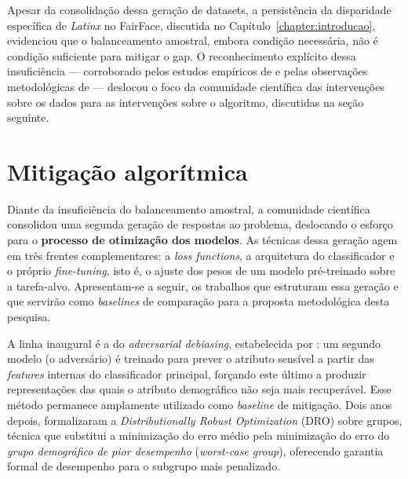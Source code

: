 Apesar da consolidação dessa geração de datasets, a persistência da disparidade específica de \emph{Latinx} no FairFace, discutida no Capítulo~\ref{chapter:introducao}, evidenciou que o balanceamento amostral, embora condição necessária, não é condição suficiente para mitigar o gap. O reconhecimento explícito dessa insuficiência --- corroborado pelos estudos empíricos de  e pelas observações metodológicas de  --- deslocou o foco da comunidade científica das intervenções sobre os dados para as intervenções sobre o algoritmo, discutidas na seção seguinte.


\section{Mitigação algorítmica}
\label{sec:rl_mitigacao}

Diante da insuficiência do balanceamento amostral, a comunidade científica consolidou uma segunda geração de respostas ao problema, deslocando o esforço para o \textbf{processo de otimização dos modelos}. As técnicas dessa geração agem em três frentes complementares: a \emph{loss functions}, a arquitetura do classificador e o próprio \emph{fine-tuning}, isto é, o ajuste dos pesos de um modelo pré-treinado sobre a tarefa-alvo. Apresentam-se a seguir, os trabalhos que estruturam essa geração e que servirão como \emph{baselines} de comparação para a proposta metodológica desta pesquisa.

A linha inaugural é a do \emph{adversarial debiasing}, estabelecida por : um segundo modelo (o adversário) é treinado para prever o atributo sensível a partir das \emph{features} internas do classificador principal, forçando este último a produzir representações das quais o atributo demográfico não seja mais recuperável. Esse método permanece amplamente utilizado como \emph{baseline} de mitigação. Dois anos depois,  formalizaram a \emph{Distributionally Robust Optimization} (DRO) sobre grupos, técnica que substitui a minimização do erro médio pela minimização do erro do \emph{grupo demográfico de pior desempenho} (\emph{worst-case group}), oferecendo garantia formal de desempenho para o subgrupo mais penalizado.

